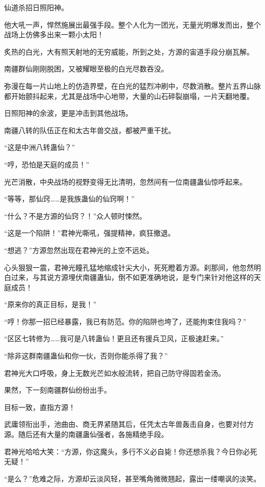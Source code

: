 \begin{this_body}
仙道杀招日照阳神。

他大吼一声，悍然施展出最强手段。整个人化为一团光，无量光明爆发而出，整个战场上仿佛多出来一颗小太阳！

炙热的白光，大有照天射地的无穷威能，所到之处，方源的宙道手段分崩瓦解。

南疆群仙刚刚脱困，又被耀眼至极的白光尽数吞没。

弥漫在每一片山地上的仿造界壁，在白光的猛烈冲刷中，尽数消散。整片五界山脉都开始颤抖起来，尤其是战场中心地带，大量的山石碎裂崩塌，一片天翻地覆。

日照阳神的余波，更是冲击到其他战场。

南疆八转的队伍正在和太古年兽交战，都被严重干扰。

“这是中洲八转蛊仙？”

“哼，恐怕是天庭的成员！”

光芒消散，中央战场的视野变得无比清明，忽然间有一位南疆蛊仙惊呼起来。

“等等，那仙窍……是我族蛊仙的仙窍啊！”

“什么？不是方源的仙窍？！”众人顿时悚然。

“这是一个陷阱！”君神光嘶吼，强提精神，疯狂撤退。

“想逃？”方源忽然出现在君神光的上空不远处。

心头狠狠一震，君神光瞳孔猛地缩成针尖大小，死死瞪着方源。刹那间，他忽然明白过来，与其说方源埋伏南疆蛊仙，倒不如更准确地说，是专门来针对他这样的天庭成员！

“原来你的真正目标，是我！”

“哼！你那一招已经暴露，我已有防范。你的陷阱也垮了，还能拘束住我吗？”

“区区七转修为……我可是八转蛊仙！更且还有援兵卫风，正极速赶来。”

“除非这群南疆蛊仙和你一伙，否则你能杀得了我？”

君神光大口呼吸，身上无数光芒如水般流转，把自己防守得固若金汤。

果然，下一刻南疆群仙纷纷出手。

目标一致，直指方源！

武庸领衔出手，池曲由、商无界紧随其后，任凭太古年兽轰击自身，也要对付方源。随后还有大量的南疆蛊仙强者，各施精绝手段。

君神光哈哈大笑：“方源，你这魔头，多行不义必自毙！你还想杀我？今日你必死无疑！”

“是么？”危难之际，方源却云淡风轻，甚至嘴角微微翘起，露出一缕嘲讽的淡笑。


\end{this_body}

